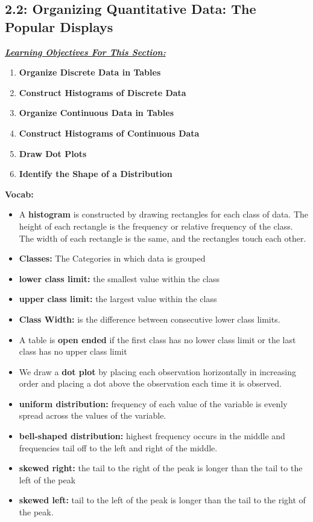 \documentclass{report}
\begin{document}
        \subsection{2.2: Organizing Quantitative Data: The Popular Displays}
        \bigbreak \noindent 
        \textbf{\textit{\underline{Learning Objectives For This Section:}}}
        \begin{enumerate}
            \item \textbf{Organize Discrete Data in Tables}
            \item \textbf{Construct Histograms of Discrete Data}
            \item \textbf{Organize Continuous Data in Tables}
            \item \textbf{Construct Histograms of Continuous Data}
            \item \textbf{Draw Dot Plots}
            \item \textbf{Identify the Shape of a Distribution}
        \end{enumerate}
        \bigbreak \noindent 
        \textbf{Vocab:}
        \begin{itemize}
            \item A \textbf{histogram} is constructed by drawing rectangles for each class of data. The height of each rectangle is the frequency or relative frequency of the class. The width of each rectangle is the same, and the rectangles touch each other.
            \item \textbf{Classes: } The Categories in which data is grouped
            \item \textbf{lower class limit:} the smallest value within the class 
            \item \textbf{upper class limit:} the largest value within the class 
            \item \textbf{Class Width: }  is the difference between consecutive lower class limits.
            \item A table is \textbf{open ended} if the first class has no lower class limit or the last class has no upper class limit
            \item We draw a \textbf{dot plot} by placing each observation horizontally in increasing order and placing a dot above the observation each time it is observed.
            \item \textbf{uniform distribution:} frequency of each value of the variable is evenly spread across the values of the variable. 
            \item \textbf{bell-shaped distribution:} highest frequency occurs in the middle and frequencies tail off to the left and right of the middle.
            \item \textbf{skewed right:} the tail to the right of the peak is longer than the tail to the left of the peak
            \item \textbf{skewed left:} tail to the left of the peak is longer than the tail to the right of the peak.
        \end{itemize}
\end{document}
